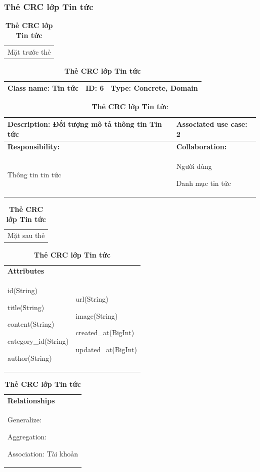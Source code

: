   \subsubsection{Thẻ CRC lớp Tin tức}
  \begin{table}[H]
    \caption{\bfseries \fontsize{12pt}{0pt}\selectfont Thẻ CRC lớp Tin tức}
    \centering
    \begin{tabularx}{0.9\textwidth}{X}
      Mặt trước thẻ
    \end{tabularx}
    \begin{tabularx}{0.9\textwidth}{|X|X|X|}
      \hline
      \textbf{Class name:} Tin tức & \textbf{ID:} 6 & \textbf{Type:} Concrete, Domain \\
      \hline
    \end{tabularx}
    \begin{tabularx}{0.9\textwidth}{|X|X|}
      \textbf{Description:} Đối tượng mô tả thông tin Tin tức & \textbf{Associated use case:} 2 \\
      \hline
      \textbf{Responsibility:} & \textbf{Collaboration:} \\
      Thông tin tin tức
      & 
      Người dùng

      Danh mục tin tức
      \\
      \hline
    \end{tabularx}
    \begin{tabularx}{0.9\textwidth}{X}
      Mặt sau thẻ
    \end{tabularx}
    \begin{tabularx}{0.9\textwidth}{|X|X|}
      \hline
      \textbf{Attributes} & \\
      id(String) 
      
      title(String)

      content(String)

      category\_id(String)

      author(String) 
      & 
      url(String) 

      image(String) 
            
      created\_at(BigInt)

      updated\_at(BigInt)
      \\
      \hline
    \end{tabularx}
    \begin{tabularx}{0.9\textwidth}{|X|}
      \textbf{Relationships} \\
      Generalize:  

      Aggregation:  
      
      Association: Tài khoản 
      \\
      \hline
    \end{tabularx}
  \end{table}


